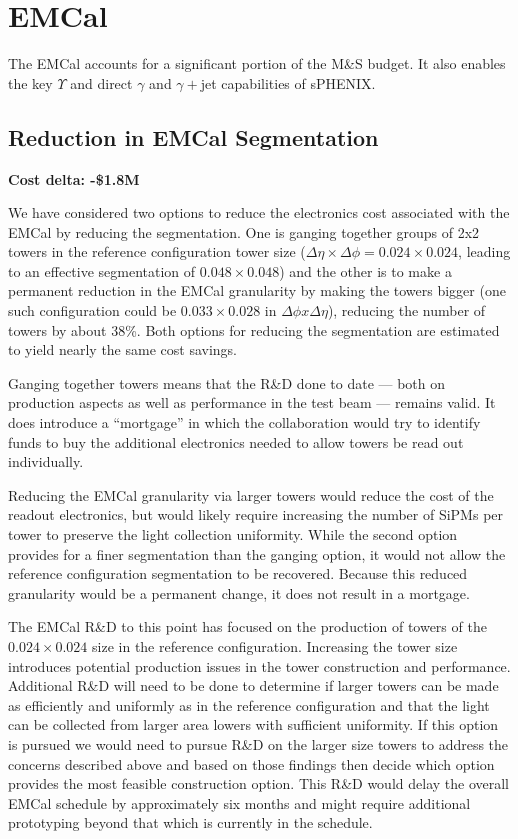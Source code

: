 \section{EMCal}

The EMCal accounts for a significant portion of the M\&S budget.  It
also enables the key $\Upsilon$ and direct $\gamma$ and $\gamma+$jet
capabilities of sPHENIX.

\subsection{Reduction in EMCal Segmentation}
\label{emcal_ganging}
\label{emcal_segmentation}

\textbf{Cost delta: -\$1.8M}

We have considered two options to reduce the electronics cost
associated with the EMCal by reducing the segmentation.  One is
ganging together groups of 2x2 towers in the reference configuration
tower size ($\Delta\eta\times\Delta\phi = 0.024\times0.024$, leading
to an effective segmentation of $0.048 \times 0.048$) and the other is
to make a permanent reduction in the EMCal granularity by making the
towers bigger (one such configuration could be $0.033 \times 0.028$ in
$\Delta \phi x \Delta \eta$), reducing the number of towers by about
38\%. Both options for reducing the segmentation are estimated to
yield nearly the same cost savings.

Ganging together towers means that the R\&D done to date --- both on
production aspects as well as performance in the test beam --- remains
valid.  It does introduce a ``mortgage'' in which the collaboration
would try to identify funds to buy the additional electronics needed
to allow towers be read out individually.

Reducing the EMCal granularity via larger towers would reduce the cost
of the readout electronics, but would likely require increasing the
number of SiPMs per tower to preserve the light collection
uniformity. While the second option provides for a finer segmentation
than the ganging option, it would not allow the reference
configuration segmentation to be recovered.  Because this reduced
granularity would be a permanent change, it does not result in a
mortgage.

The EMCal R\&D to this point has focused on the production of towers
of the $0.024\times 0.024$ size in the reference configuration.
Increasing the tower size introduces potential production issues in
the tower construction and performance. Additional R\&D will need to
be done to determine if larger towers can be made as efficiently and
uniformly as in the reference configuration and that the light can be
collected from larger area lowers with sufficient uniformity.  If this
option is pursued we would need to pursue R\&D on the larger size
towers to address the concerns described above and based on those
findings then decide which option provides the most feasible
construction option.  This R\&D would delay the overall EMCal schedule
by approximately six months and might require additional prototyping
beyond that which is currently in the schedule.
